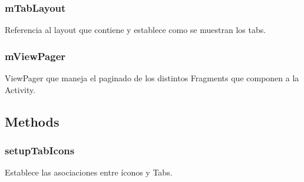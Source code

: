 \documentclass[letterpaper,10pt,english]{sphinxmanual}
\begin{document}
\subsubsection{mTabLayout}
\label{Activities/MainScreenActivity:mtablayout}

\begin{fulllineitems}
\label{Activities/MainScreenActivity:com.fiuba.tallerii.jobify.MainScreenActivity.mTabLayout}
Referencia al layout que contiene y establece como se muestran los tabs.

\end{fulllineitems}



\subsubsection{mViewPager}
\label{Activities/MainScreenActivity:mviewpager}

\begin{fulllineitems}
\label{Activities/MainScreenActivity:com.fiuba.tallerii.jobify.MainScreenActivity.mViewPager}
ViewPager que maneja el paginado de los distintos Fragments que componen a la Activity.

\end{fulllineitems}



\subsection{Methods}
\label{Activities/MainScreenActivity:methods}

\subsubsection{setupTabIcons}
\label{Activities/MainScreenActivity:setuptabicons}

\begin{fulllineitems}
\label{Activities/MainScreenActivity:com.fiuba.tallerii.jobify.MainScreenActivity.setupTabIcons()}
Establece las asociaciones entre íconos y Tabs.

\end{fulllineitems}
\end{document}
